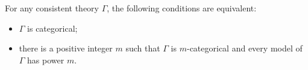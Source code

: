 For any consistent theory $\Gamma$, the following conditions are equivalent:

\begin{itemize}
\item[(i)] $\Gamma$ is categorical;
\item[(ii)] there is a positive integer $m$ such that $\Gamma$ is $m$-categorical and every model of $\Gamma$ has power $m$.
\end{itemize}

